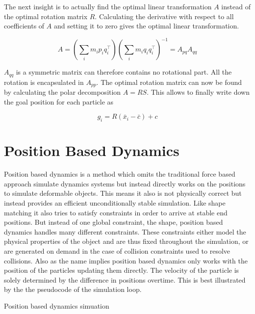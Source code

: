 The next insight is to actually find the optimal linear transformation \(A\) instead of the optimal rotation matrix \(R\).  Calculating the derivative with respect to all coefficients of \(A\) and setting it to zero gives the optimal linear transformation.

\begin{equation}
A = (\sum_i m_i p_i q_i^\top)(\sum_i m_i q_i q_i^\top)^{-1}=A_{pq}A_{qq}
\end{equation}

\(A_{qq}\) is a symmetric matrix can therefore contains no rotational part. All the rotation is encapsulated in \(A_{pp}\). The optimal rotation matrix can now be found by calculating the polar decomposition \(A = RS\). This allows to finally write down the goal position for each particle as

\begin{equation}
g_i = R(\bar{x}_i - \bar{c}) + c
\end{equation}

\section{Position Based Dynamics}
\label{sec:position_based_dynamics}

Position based dynamics is a method which omits the traditional force based approach simulate dynamics systems but instead directly works on the positions to simulate deformable objects. This means it also is not physically correct but instead provides an efficient unconditionally stable simulation. Like shape matching it also tries to satisfy constraints in order to arrive at stable end positions. But instead of one global constraint, the shape, position based dynamics handles many different constraints. These constraints either model the physical properties of the object and are thus fixed throughout the simulation, or are generated on demand in the case of collision constraints used to resolve collisions. Also as the name implies position based dynamics only works with the position of the particles updating them directly. The velocity of the particle is solely determined by the difference in positions overtime. This is best illustrated by the the pseudocode of the simulation loop.

\begin{algorithm}[h!]
\caption{Position based dynamics simuation}
\begin{algorithmic}[1]
\ENDFOR
\LOOP
	 \ENDFOR
	 \ENDFOR
	  \ENDFOR
	\ENDWHILE
	\ENDFOR
\ENDLOOP
\end{algorithmic}
\end{algorithm}


